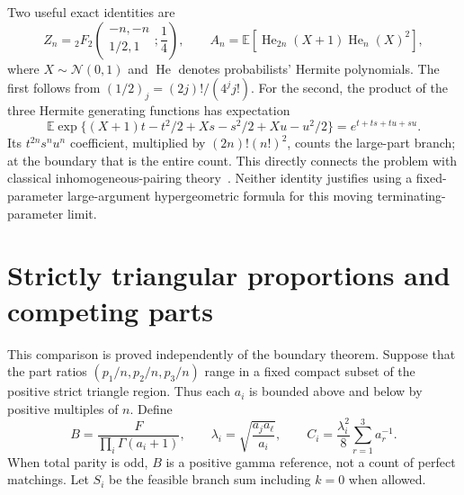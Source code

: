 \documentclass[11pt,letterpaper]{article}
\theoremstyle{remark}\newtheorem{remark}[theorem]{Remark}
\newcommand{\E}{\mathbb E}\newcommand{\Pp}{\mathbb P}
\newcommand{\Normal}{\mathcal N}
\begin{document}
Two useful exact identities are
\begin{equation}\label{tmm:bd:eq:hyperHermite}
 Z_n={}_2F_2\!\left(\begin{matrix}-n,-n\\1/2,1\end{matrix};\frac14\right),
 \qquad
 A_n=\E\!\left[\operatorname{He}_{2n}(X+1)\operatorname{He}_n(X)^2\right],
\end{equation}
where $X\sim\Normal(0,1)$ and $\operatorname{He}$ denotes probabilists' Hermite polynomials. The first follows from $(1/2)_j=(2j)!/(4^jj!)$. For the second, the product of the three Hermite generating functions has expectation
\[
 \E\exp\{(X+1)t-t^2/2+Xs-s^2/2+Xu-u^2/2\}
 =e^{t+ts+tu+su}.
\]
Its $t^{2n}s^nu^n$ coefficient, multiplied by $(2n)!(n!)^2$, counts the large-part branch; at the boundary that is the entire count. This directly connects the problem with classical inhomogeneous-pairing theory~\cite{azor,paris}. Neither identity justifies using a fixed-parameter large-argument hypergeometric formula for this moving terminating-parameter limit.

\section{Strictly triangular proportions and competing parts}\label{tmm:bd:sec:strict}
This comparison is proved independently of the boundary theorem. Suppose that the part ratios $(p_1/n,p_2/n,p_3/n)$ range in a fixed compact subset of the positive strict triangle region. Thus each $a_i$ is bounded above and below by positive multiples of $n$. Define
\[
 B=\frac{F}{\prod_i\Gamma(a_i+1)},\qquad
 \lambda_i=\sqrt{\frac{a_ja_\ell}{a_i}},\qquad
 C_i=\frac{\lambda_i^2}{8}\sum_{r=1}^3a_r^{-1}.
\]
When total parity is odd, $B$ is a positive gamma reference, not a count of perfect matchings. Let $S_i$ be the feasible branch sum including $k=0$ when allowed.
\end{document}
